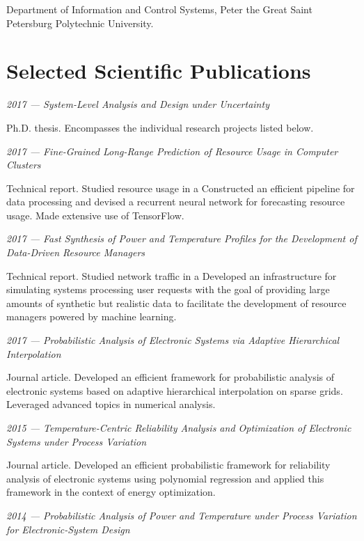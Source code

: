 \documentclass[journal]{IEEEtran}
\begin{document}
Department of Information and Control Systems, Peter the Great Saint Petersburg
Polytechnic University.

\section{Selected Scientific Publications}
\emph{2017 --- System-Level Analysis and Design under Uncertainty}
\cite{ukhov2017d}

Ph.D. thesis. Encompasses the individual research projects listed below.

\emph{2017 --- Fine-Grained Long-Range Prediction of Resource Usage in Computer
Clusters} \cite{ukhov2017b}

Technical report. Studied resource usage in a
 Constructed
an efficient pipeline for data processing and devised a recurrent neural network
for forecasting resource usage. Made extensive use of TensorFlow.

\emph{2017 --- Fast Synthesis of Power and Temperature Profiles for the
Development of Data-Driven Resource Managers} \cite{ukhov2017c}

Technical report. Studied network traffic in a
 Developed an
infrastructure for simulating systems processing user requests with the goal of
providing large amounts of synthetic but realistic data to facilitate the
development of resource managers powered by machine learning.

\emph{2017 --- Probabilistic Analysis of Electronic Systems via Adaptive
Hierarchical Interpolation} \cite{ukhov2017a}

Journal article. Developed an efficient framework for probabilistic analysis of
electronic systems based on adaptive hierarchical interpolation on sparse grids.
Leveraged advanced topics in numerical analysis.

\emph{2015 --- Temperature-Centric Reliability Analysis and Optimization of
Electronic Systems under Process Variation} \cite{ukhov2015}

Journal article. Developed an efficient probabilistic framework for reliability
analysis of electronic systems using polynomial regression and applied this
framework in the context of energy optimization.

\emph{2014 --- Probabilistic Analysis of Power and Temperature under Process
Variation for Electronic-System Design} \cite{ukhov2014b}
\end{document}
